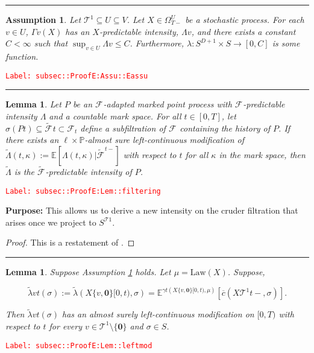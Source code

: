 \documentclass[12pt]{article}
\newcommand{\mb}{\mathbb}
\newcommand{\mc}{\mathcal}
\newcommand{\ra}{\rightarrow}
\newcommand{\ov}{\overline}
\newcommand{\te}{\text}
\newcommand{\tr}{\textcolor{red}}
\newcommand{\labe}[1]{\tr{\texttt{Label: #1}}}
\newcommand{\purpose}{\textbf{Purpose: }}
\newcommand{\lin}{\rule{\linewidth}{0.4 pt}}
\newcommand{\pr}{\mb{P}}							%
\newcommand{\ex}[1]{\mb{E}\left[#1\right]}			%
\newcommand{\exmu}[2]{\mb{E}^{#1}\left[#2\right]}	%
\renewcommand{\root}{\mathbf{0}}				%
\renewcommand{\v}{v}							%
\renewcommand{\U}{U}							%
\renewcommand{\S}{S}							%
\newcommand{\s}{\sigma}							%
\newcommand{\T}{T}								%
\renewcommand{\t}{t}							%
\newcommand{\sset}{\Omega}						%
\newcommand{\F}{\mc{F}}							%
\newcommand{\X}{X}								%
\newcommand{\carp}[1]{^{#1}}					%
\newcommand{\vsi}[1]{^{#1}}						%
\newcommand{\ts}[1]{_{#1}}						%
\newcommand{\const}{C}							%
\newcommand{\degr}{D}							%
\newcommand{\IGrg}{\ov{c}}						%
\newcommand{\tree}{\mc{T}}						%
\newcommand{\sln}[1]{^{#1}}						%
\newcommand{\Sm}{\ell}							%
\newcommand{\alt}[1]{\widetilde{#1}}			%
\newcommand{\m}{\mu}							%
\newcommand{\cm}{\gamma}						%
\newcommand{\law}{\te{Law}}						%
\newcommand{\pmap}{\Gamma}						%
\renewcommand{\mark}{\kappa}					%
\newcommand{\rp}{P}								%
\newcommand{\ratee}{\Lambda}					%
\newcommand{\crate}{\alt{\lambda}}				%
\newcommand{\cratee}{\alt{\Lambda}} 			%
\newtheorem{lem}[thms]{Lemma}
\newtheorem{assu}[thms]{Assumption}
\begin{document}
\lin

\begin{assu}
Let \(\tree\sln{1}\subseteq\U \subseteq V\). Let \(\X{}{}\in \sset\vsi{\U}\ts{\T-}\) be a stochastic process. For each \(\v\in \U\), \(\pmap{\v}(\X{}{})\) has an \(\X{}{}\)-predictable intensity, \(\ratee{\v}\), and there exists a constant \(\const{} < \infty\) such that \(\sup_{\v\in\U} \ratee{\v} \leq \const{}\). Furthermore, \(\lambda: \S\carp{\degr+1}\times \S\ra[0,\const{}]\) is some function.
\label{subsec::ProofE:Assu::Eassu}
\end{assu}
\labe{subsec::ProofE:Assu::Eassu}

\lin

\begin{lem}
Let \(\rp{}\) be an \(\F\vsi{}\ts{}\)-adapted marked point process with \(\F\vsi{}\ts{}\)-predictable intensity \(\ratee{}\) and a countable mark space. For all \(\t \in [0,\T]\), let \(\sigma(\rp{\t}) \subseteq \alt{\F\ts{}}{\t}\subset \F\vsi{}\ts{\t}\) define a subfiltration of \(\F\vsi{}\ts{}\) containing the history of \(\rp{}\). If there exists an \(\Sm\times \pr\)-almost sure left-continuous modification of \(\cratee{}{}(\t,\mark{}) := \ex{\ratee{}(\t,\mark{})|\alt{\F\vsi{}\ts{}}^{\t-}}\) with respect to \(\t\) for all \(\mark{}\) in the mark space, then \(\cratee{}{}\) is the \(\alt{\F\vsi{}\ts{}}\)-predictable intensity of \(\rp{}\).
\label{subsec::ProofE:Lem::filtering}
\end{lem}
\labe{subsec::ProofE:Lem::filtering}

\purpose This allows us to derive a new intensity on the cruder filtration that arises once we project to \(\S\carp{\tree{1}}\).

\begin{proof}
This is a restatement of \cite[Theorem 14.3.III]{DalVer08}.
\end{proof}

\lin

\begin{lem}
Suppose Assumption \ref{subsec::ProofE:Assu::Eassu} holds. Let \(\m{}{}{} = \law(\X{}{})\). Suppose,

\[\crate{\v}{\t}(\s) := \crate{}{}(\X{\{\v,\root\}}{[0,\t)},\s) = \exmu{\cm{\t}(\X{\{\v,\root\}}{[0,\t)},\m{}{}{})}{\IGrg(\X{\tree\sln{1}}{\t-},\s)}.\]


Then \(\crate{\v}{\t}(\s)\) has an almost surely left-continuous modification on \([0,\T)\) with respect to \(\t\) for every \(\v \in \tree\sln{1}\setminus\{\root\}\) and \(\s \in \S\).
\label{subsec::ProofE:Lem::leftmod}
\end{lem}
\labe{subsec::ProofE:Lem::leftmod}
\end{document}
